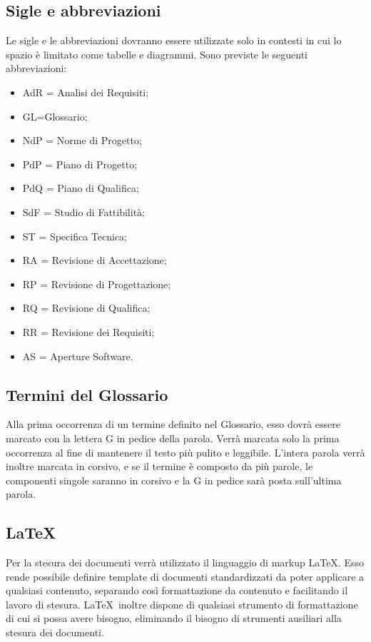 \subsection{Sigle e abbreviazioni}
\label{5.5}
Le sigle e le abbreviazioni dovranno essere utilizzate solo in contesti in cui lo spazio è limitato come tabelle e diagrammi. Sono previste le seguenti abbreviazioni:
\begin{itemize}
\item AdR = Analisi dei Requisiti;
\item GL=Glossario;
\item NdP = Norme di Progetto;
\item PdP = Piano di Progetto;
\item PdQ = Piano di Qualifica;
\item SdF = Studio di Fattibilità;
\item ST = Specifica Tecnica;
\item RA = Revisione di Accettazione;
\item RP = Revisione di Progettazione;
\item RQ = Revisione di Qualifica;
\item RR = Revisione dei Requisiti;
\item AS = Aperture Software.
\end{itemize}

\subsection{Termini del Glossario}
\label{5.6}
Alla prima occorrenza di un termine definito nel Glossario, esso dovrà essere marcato con la lettera G in pedice della parola. Verrà marcata solo la prima occorrenza al fine di mantenere il testo più pulito e leggibile. L'intera parola verrà inoltre marcata in corsivo, e se il termine è composto da più parole, le componenti singole saranno in corsivo e la G in pedice sarà posta sull'ultima parola. 

\subsection{LaTeX}
\label{5.7}
Per la stesura dei documenti verrà utilizzato il linguaggio di markup \LaTeX. Esso rende possibile definire template di documenti standardizzati da poter applicare a qualsiasi contenuto, separando così formattazione da contenuto e facilitando il lavoro di stesura. \LaTeX\ inoltre dispone di qualsiasi strumento di formattazione di cui si possa avere bisogno, eliminando il bisogno di strumenti ausiliari alla stesura dei documenti.

